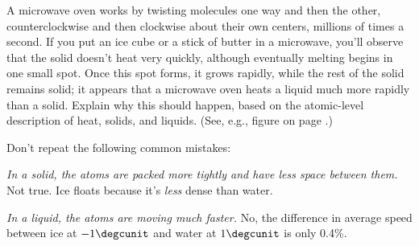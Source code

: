 A microwave oven works by twisting molecules one way and
then the other, counterclockwise and then clockwise about
their own centers, millions of times a second. If you put an
ice cube or a stick of butter in a microwave, you'll observe
that the solid doesn't heat very quickly, although
eventually melting begins in one small spot. Once this
spot forms, it grows rapidly, while the rest of the solid
remains solid; it appears
that a microwave oven heats a liquid much more
rapidly than a solid. Explain why this should happen, based
on the atomic-level description of heat, solids, and liquids.
(See, e.g., figure  on page \pageref{fig:random-motion}.)

Don't repeat the following common mistakes:

\begin{indentedblock}
 \emph{In a solid, the atoms are packed more tightly and have less
space between them.} Not true. Ice floats because it's \emph{less} dense
than water.

\noindent\emph{In a liquid, the atoms are moving much faster.} No, the difference
in average speed between ice at $-1\degcunit$ and water at $1\degcunit$ is
only 0.4\%.
\end{indentedblock}

